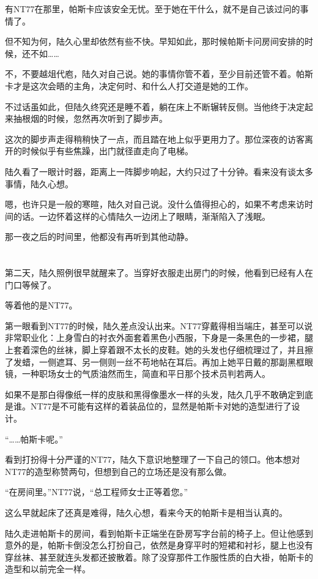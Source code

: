 有NT77在那里，帕斯卡应该安全无忧。至于她在干什么，就不是自己该过问的事情了。

但不知为何，陆久心里却依然有些不快。早知如此，那时候帕斯卡问房间安排的时候，还不如……

不，不要越俎代庖，陆久对自己说。她的事情你管不着，至少目前还管不着。帕斯卡才是这次会晤的主角，决定何时、和什么人打交道是她的工作。

不过话虽如此，但陆久终究还是睡不着，躺在床上不断辗转反侧。当他终于决定起来抽根烟的时候，忽然再次听到了脚步声。

这次的脚步声走得稍稍快了一点，而且踏在地上似乎更用力了。那位深夜的访客离开的时候似乎有些焦躁，出门就径直走向了电梯。

陆久看了一眼计时器，距离上一阵脚步响起，大约只过了十分钟。看来没有谈太多事情，陆久心想。

嗯，也许只是一般的寒暄，陆久对自己说。没什么值得担心的，如果不考虑来访时间的话。一边怀着这样的心情陆久一边闭上了眼睛，渐渐陷入了浅眠。

那一夜之后的时间里，他都没有再听到其他动静。

\section*{}

第二天，陆久照例很早就醒来了。当穿好衣服走出房门的时候，他看到已经有人在门口等候了。

等着他的是NT77。

第一眼看到NT77的时候，陆久差点没认出来。NT77穿戴得相当端庄，甚至可以说非常职业化：上身雪白的衬衣外面套着黑色小西服，下身是一条黑色的一步裙，腿上套着深色的丝袜，脚上穿着跟不太长的皮鞋。她的头发也仔细梳理过了，并且擦了发蜡，一侧遮耳、另一侧则一丝不苟地帖在耳后。再加上她平日戴的那副黑框眼镜，一种职场女士的气质油然而生，简直和平日那个技术员判若两人。

如果不是那白得像纸一样的皮肤和黑得像墨水一样的头发，陆久几乎不敢确定到底是谁。NT77是不可能有这样的着装品位的，显然是帕斯卡对她的造型进行了设计。

“……帕斯卡呢。”

看到打扮得十分严谨的NT77，陆久下意识地整理了一下自己的领口。他本想对NT77的造型称赞两句，但想到自己的立场还是没有那么做。

“在房间里。”NT77说，“总工程师女士正等着您。”

这么早就起床了还真是难得，陆久心想，看来今天的帕斯卡是相当认真的。

陆久走进帕斯卡的房间，看到帕斯卡正端坐在卧房写字台前的椅子上。但让他感到意外的是，帕斯卡倒没怎么打扮自己，依然是身穿平时的短裙和衬衫，腿上也没有穿丝袜、甚至就连头发都还披散着。除了没穿那件工作服性质的白大褂，帕斯卡的造型和以前完全一样。


